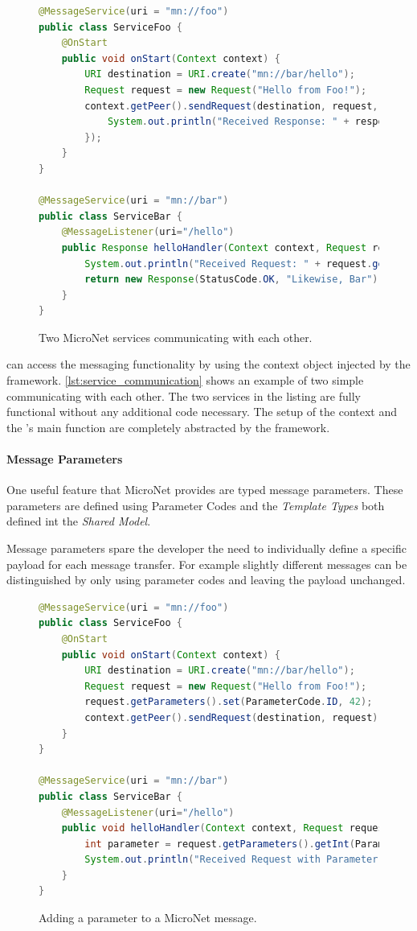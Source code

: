 \begin{figure}
\begin{lstlisting}[language=Java,firstnumber=1] 
@MessageService(uri = "mn://foo")
public class ServiceFoo {
	@OnStart
	public void onStart(Context context) {
		URI destination = URI.create("mn://bar/hello");
		Request request = new Request("Hello from Foo!");
		context.getPeer().sendRequest(destination, request, response -> {
			System.out.println("Received Response: " + response.getData());
		});
	}
}

@MessageService(uri = "mn://bar")
public class ServiceBar {
	@MessageListener(uri="/hello")
	public Response helloHandler(Context context, Request request) {
		System.out.println("Received Request: " + request.getData());
		return new Response(StatusCode.OK, "Likewise, Bar");
	}
}
\end{lstlisting}
\caption{Two MicroNet services communicating with each other.}
\label{lst:service_communication}
\end{figure}

\mssuc{} can access the messaging functionality by using the context object
injected by the framework. \autoref{lst:service_communication} shows an example
of two simple \mss{} communicating with each other. The two services in the
listing are fully functional without any additional code necessary. The setup of
the context and the \ms{}'s main function are completely abstracted by the
framework.

\paragraph{Message Parameters}

One useful feature that MicroNet provides are typed message parameters. These
parameters are defined using Parameter Codes and the \textit{Template Types}
both defined int the \textit{Shared Model}.

Message parameters spare the developer the need to individually define a
specific payload for each message transfer. For example slightly different
messages can be distinguished by only using parameter codes and leaving the
payload unchanged.

\begin{figure}
\begin{lstlisting}[language=Java,firstnumber=1] 
@MessageService(uri = "mn://foo")
public class ServiceFoo {
	@OnStart
	public void onStart(Context context) {
		URI destination = URI.create("mn://bar/hello");
		Request request = new Request("Hello from Foo!");
		request.getParameters().set(ParameterCode.ID, 42);
		context.getPeer().sendRequest(destination, request);
	}
}

@MessageService(uri = "mn://bar")
public class ServiceBar {
	@MessageListener(uri="/hello")
	public void helloHandler(Context context, Request request) {
		int parameter = request.getParameters().getInt(ParameterCode.ID);
		System.out.println("Received Request with Parameter: " + parameter);
	}
}
\end{lstlisting}
\caption{Adding a parameter to a MicroNet message.}
\label{lst:message_parameters}
\end{figure}


